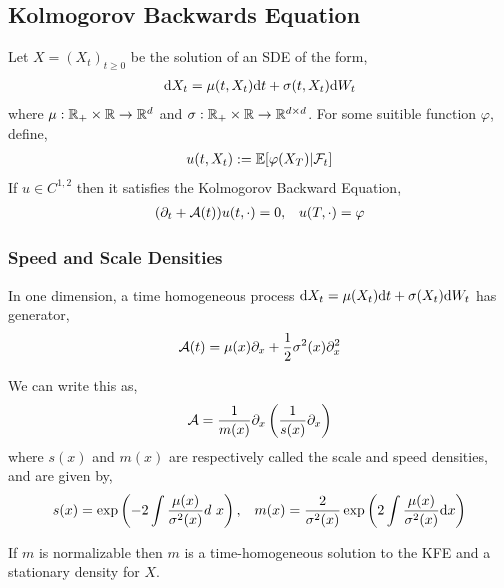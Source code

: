 \documentclass[12pt]{article}
\begin{document}
\subsection{Kolmogorov Backwards Equation}
Let \( X = (X_t)_{t\geq 0} \) be the solution of an SDE of the form,
\begin{align*}
    \mathrm{d} X_t = \mu(t,X_t)\mathrm{d} t + \sigma(t,X_t)\mathrm{d} W_t
\end{align*}
where \( \mu:\mathbb{R}_+\times\mathbb{R} \to\mathbb{R}^d  \) and \( \sigma:\mathbb{R}_+\times\mathbb{R} \to \mathbb{R}^{d\times d} \).
For some suitible function \( \varphi \), define,
\begin{align*}
    u(t,X_t):= \mathbb{E}[\varphi(X_T)|\mathcal{F}_t]
\end{align*}
If \( u\in C^{1,2} \) then it satisfies the Kolmogorov Backward Equation,
\begin{align*}
    (\partial_t + \cA(t)) u(t,\cdot) = 0, && u(T,\cdot) = \varphi %
\end{align*}

\subsubsection{Speed and Scale Densities}
In one dimension, a time homogeneous process \( \mathrm{d} X_t = \mu(X_t) \mathrm{d} t + \sigma(X_t) \mathrm{d} W_t \) has generator,
\begin{align*}
    \mathcal{A}(t) = \mu(x) \partial_x + \frac{1}{2}\sigma^2(x)\partial_x^2
\end{align*}

We can write this as,
\begin{align*}
    \mathcal{A} = \frac{1}{m(x)}\partial_x \left( \frac{1}{s(x)}\partial_x \right)
\end{align*}
where \( s(x) \) and \( m(x) \) are respectively called the scale and speed densities, and are given by,
\begin{align*}
    s(x) = \exp \left( - 2\int \frac{\mu(x)}{\sigma^2(x)}d\ x \right)
    ,&& m(x) = \frac{2}{\sigma^2(x)} \exp \left( 2\int \frac{\mu(x)}{\sigma^2(x)}\mathrm{d} x \right)
\end{align*}

If \( m \) is normalizable then \( m \) is a time-homogeneous solution to the KFE and a stationary density for \( X \).
\end{document}
